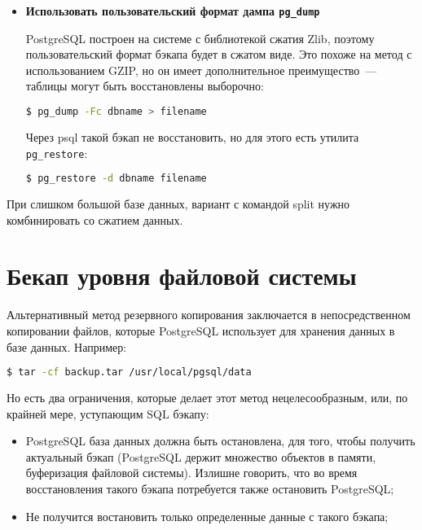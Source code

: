 \begin{itemize}
  \item \textbf{Использовать пользовательский формат дампа \lstinline!pg_dump!}

PostgreSQL построен на системе с библиотекой сжатия Zlib, поэтому пользовательский формат бэкапа будет в сжатом виде. Это похоже на метод с использованием GZIP, но он имеет дополнительное преимущество~--- таблицы могут быть восстановлены выборочно:

\begin{lstlisting}[language=Bash,label=lst:backups12,caption=Создание бэкапа PostgreSQL]
$ pg_dump -Fc dbname > filename
\end{lstlisting}

Через psql такой бэкап не восстановить, но для этого есть утилита \lstinline!pg_restore!:

\begin{lstlisting}[language=Bash,label=lst:backups13,caption=Восстановление бэкапа PostgreSQL]
$ pg_restore -d dbname filename
\end{lstlisting}

\end{itemize}

При слишком большой базе данных, вариант с командой split нужно комбинировать со сжатием данных.



\section{Бекап уровня файловой системы}

Альтернативный метод резервного копирования заключается в непосредственном копировании файлов, которые PostgreSQL использует для хранения данных в базе данных. Например:

\begin{lstlisting}[language=Bash,label=lst:backups14,caption=Бэкап PostgreSQL файлов]
$ tar -cf backup.tar /usr/local/pgsql/data
\end{lstlisting}

Но есть два ограничения, которые делает этот метод нецелесообразным, или, по крайней мере, уступающим SQL бэкапу:

\begin{itemize}
  \item PostgreSQL база данных должна быть остановлена, для того, чтобы получить актуальный бэкап (PostgreSQL держит множество объектов в памяти, буферизация файловой системы). Излишне говорить, что во время восстановления такого бэкапа потребуется также остановить PostgreSQL;
  \item Не получится востановить только определенные данные с такого бэкапа;
\end{itemize}

